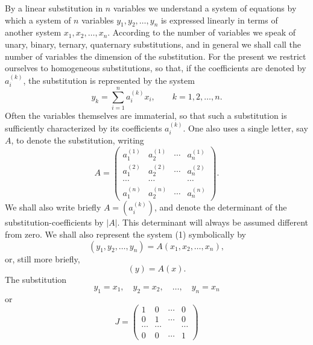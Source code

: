 \documentclass[11pt]{article}
\begin{document}
By a linear substitution in $n$ variables we understand a system of equations by which a system of $n$ variables $y_1,y_2,\ldots,y_n$ is expressed linearly in terms of another system $x_1,x_2,\ldots,x_n$. According to the number of variables we speak of unary, binary, ternary, quaternary substitutions, and in general we shall call the number of variables the dimension of the substitution. For the present we restrict ourselves to homogeneous substitutions, so that, if the coefficients are denoted by $a_i^{(k)}$, the substitution is represented by the system
\begin{equation}
y_k=\sum_{i=1}^{n} a_i^{(k)}x_i,\qquad k=1,2,\ldots,n.
\tag{1}
\end{equation}
Often the variables themselves are immaterial, so that such a substitution is sufficiently characterized by its coefficients $a_i^{(k)}$. One also uses a single letter, say $A$, to denote the substitution, writing
\begin{equation}
A=\begin{pmatrix}
a_1^{(1)}&a_2^{(1)}&\cdots&a_n^{(1)}\\
a_1^{(2)}&a_2^{(2)}&\cdots&a_n^{(2)}\\
\cdots&\cdots&&\cdots\\
a_1^{(n)}&a_2^{(n)}&\cdots&a_n^{(n)}
\end{pmatrix}.
\tag{2}
\end{equation}
We shall also write briefly $A=(a_i^{(k)})$, and denote the determinant of the substitution-coefficients by $|A|$. This determinant will always be assumed different from zero. We shall also represent the system (1) symbolically by
\begin{equation}
(y_1,y_2,\ldots,y_n)=A(x_1,x_2,\ldots,x_n),
\tag{3}
\end{equation}
or, still more briefly,
\begin{equation}
(y)=A(x).
\tag{4}
\end{equation}
The substitution
\begin{equation}
y_1=x_1,
\quad y_2=x_2,
\quad \ldots,
\quad y_n=x_n
\tag{5}
\end{equation}
or
\begin{equation}
J=\begin{pmatrix}
1&0&\cdots&0\\
0&1&\cdots&0\\
\cdots&\cdots&&\cdots\\
0&0&\cdots&1
\end{pmatrix}
\tag{6}
\end{equation}
\end{document}
